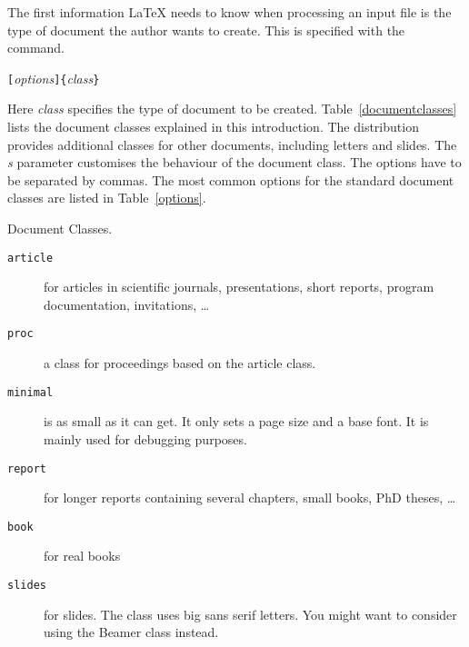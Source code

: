 The first information \LaTeX{} needs to know when processing an
input file is the type of document the author wants to create. This
is specified with the  command.
\begin{lscommand}
\verb|[|\emph{options}\verb|]{|\emph{class}\verb|}|
\end{lscommand}
\noindent Here \emph{class} specifies the type of document to be created.
Table~\ref{documentclasses} lists the document classes explained in
this introduction. The \LaTeXe{} distribution provides additional
classes for other documents, including letters and slides.  The
\emph{s} parameter customises the behaviour of the document
class. The options have to be separated by commas. The most common options for the standard document
classes are listed in
Table~\ref{options}.


\begin{table}[!bp]
\caption{Document Classes.} \label{documentclasses}
\begin{lined}{\textwidth}
\begin{description}
 
\item [\normalfont\texttt{article}] for articles in scientific journals, presentations,
  short reports, program documentation, invitations, \ldots
\item [\normalfont\texttt{proc}] a class for proceedings based on the article class.
\item [\normalfont\texttt{minimal}] is as small as it can get.
It only sets a page size and a base font. It is mainly used for debugging
purposes.
\item [\normalfont\texttt{report}] for longer reports containing several chapters, small
  books, PhD theses, \ldots {}
\item [\normalfont\texttt{book}] for real books 
\item [\normalfont\texttt{slides}] for slides. The class uses big sans serif
  letters. You might want to consider using the Beamer class instead.
\end{description}
\end{lined}
\end{table}

